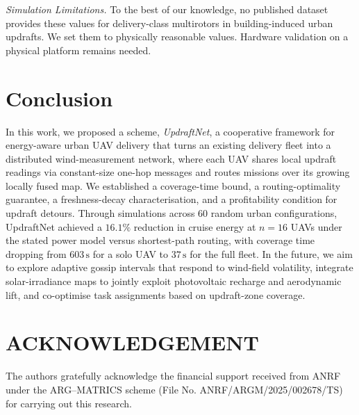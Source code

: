 \documentclass[conference]{IEEEtran}
\newcommand{\rd}[1]{#1}   %
\begin{document}
\textit{Simulation Limitations.}
To the best of our knowledge, no published dataset provides these values for delivery-class multirotors in building-induced urban updrafts.
We set them to physically reasonable values.
Hardware validation on a physical platform remains needed.

\section{Conclusion}
In this work, we proposed a scheme, \textit{UpdraftNet}, a cooperative
framework for energy-aware urban UAV delivery that turns an existing
delivery fleet into a distributed wind-measurement network, where each
UAV shares local updraft readings via constant-size \rd{one-hop} \rd{messages} and routes missions over \rd{its growing locally fused} map. We established a coverage-time bound, a routing-optimality guarantee, a freshness-decay
characterisation, and a profitability condition for updraft detours.
Through simulations across 60 random urban configurations, UpdraftNet
achieved a \rd{$16.1\%$} reduction in cruise energy
at $n=16$ UAVs \rd{under the stated power model} versus shortest-path routing, with coverage
time dropping from \rd{$603\,\text{s}$} for a solo UAV to \rd{$37\,\text{s}$} for the full
fleet. In the future, we aim to explore adaptive gossip intervals
that respond to wind-field volatility, integrate solar-irradiance
maps to jointly exploit photovoltaic recharge and aerodynamic
lift, and co-optimise task assignments based on updraft-zone
coverage.

\section*{ACKNOWLEDGEMENT}
The authors gratefully acknowledge the financial support received from ANRF under the ARG--MATRICS scheme (File No. ANRF/ARGM/2025/002678/TS) for carrying out this research.
\end{document}
